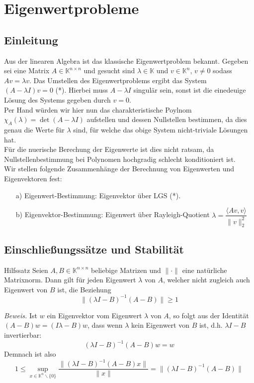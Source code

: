 \section{Eigenwertprobleme}
\subsection{Einleitung}
Aus der linearen Algebra ist das klassische Eigenwertproblem bekannt. Gegeben sei eine Matrix 
$A\in\mathbb{K}^{n\times n}$ und gesucht sind $\lambda\in\mathbb{K}$ und $v\in\mathbb{K}^n$, $v\neq 0$ 
sodass $Av=\lambda v$. Das Umstellen des Eigenwertproblems ergibt das System $(A-\lambda I)v=0$ (*). Hierbei muss 
$A-\lambda I$ singulär sein, sonst ist die einedeuige Lösung des Systems gegeben durch $v=0$.\\
Per Hand würden wir hier nun das charakteristische Poylnom $\chi_A(\lambda)=\det(A-\lambda I)$ aufstellen und 
dessen Nullstellen bestimmen, da dies genau die Werte für $\lambda$ sind, für welche das obige System nicht-triviale
Lösungen hat. \\
Für die nuerische Berechung der Eigenwerte ist dies nicht ratsam, da Nullstellenbestimmung bei Polynomen 
hochgradig schlecht konditioniert ist. \\
Wir stellen folgende Zusammenhänge der Berechnung von Eigenwerten und Eigenvektoren fest:
\begin{enumerate}
    \item[a)] Eigenwert-Bestimmung: Eigenvektor über LGS (*).
    \item[b)] Eigenvektor-Bestimmung: 
        Eigenwert über Rayleigh-Quotient $\lambda=\dfrac{\langle Av,v\rangle}{\|v\|_2^2}$ 
\end{enumerate}
\subsection{Einschließungssätze und Stabilität}
\begin{thmbox}{Hilfssatz}
    Seien $A,B\in\mathbb{K}^{n\times n}$ beliebige Matrizen und $\|\cdot\|$ eine natürliche Matrixnorm. Dann gilt 
    für jeden Eigenwert $\lambda$ von $A$, welcher nicht zugleich auch Eigenwert von $B$ ist, die Beziehung
    \[\|(\lambda I-B)^{-1}(A-B)\|\geq 1\]
\end{thmbox}
\textit{Beweis.} Ist $w$ ein Eigenvektor vom Eigenwert $\lambda$ von $A$, so folgt aus der Identität 
$(A-B)w = (I\lambda - B)w$, dass wenn $\lambda$ kein Eigenwert von $B$ ist, d.h. $\lambda I-B$ invertierbar: 
\[(\lambda I-B)^{-1}(A-B)w=w\]
Demnach ist also 
\[1\leq \sup_{x\in\mathbb{K}^n\backslash\{0\}} \dfrac{\|(\lambda I-B)^{-1}(A-B)x\|}{\|x\|}
=\|(\lambda I-B)^{-1}(A-B)\|\]
